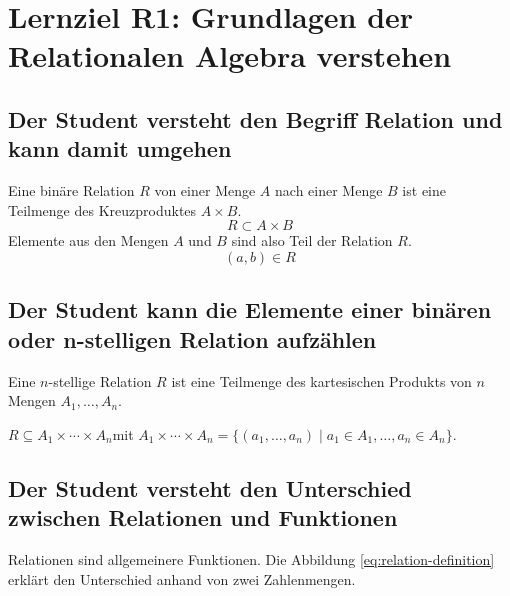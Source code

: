 \section{Lernziel R1: Grundlagen der Relationalen Algebra verstehen}

\subsection{Der Student versteht den Begriff Relation und kann damit umgehen}
Eine binäre Relation \(R\) von einer Menge \(A\) nach einer Menge \(B\) ist eine Teilmenge des Kreuzproduktes \(A \times B\).
\begin{equation*}
    R \subset A \times B
\end{equation*}
Elemente aus den Mengen \(A\) und \(B\) sind also Teil der Relation \(R\).
\begin{equation*}
  (a,b)\in R
\end{equation*}


\subsection{Der Student kann die Elemente einer binären oder n-stelligen Relation aufzählen}
Eine \(n\)-stellige Relation \(R\) ist eine Teilmenge des kartesischen Produkts von \(n\) Mengen \(A_{1}, \dotsc, A_{n}\).


\( R \subseteq A_{1} \times \dotsb \times A_{n}\)mit \(A_1 \times \dotsb \times A_n = \{(a_1, \dotsc, a_n) \mid a_1 \in A_1, \dotsc, a_n \in A_n\}\).

\subsection{Der Student versteht den Unterschied zwischen Relationen und Funktionen}
Relationen sind allgemeinere Funktionen. Die Abbildung \ref{eq:relation-definition} erklärt den Unterschied anhand von zwei Zahlenmengen.

